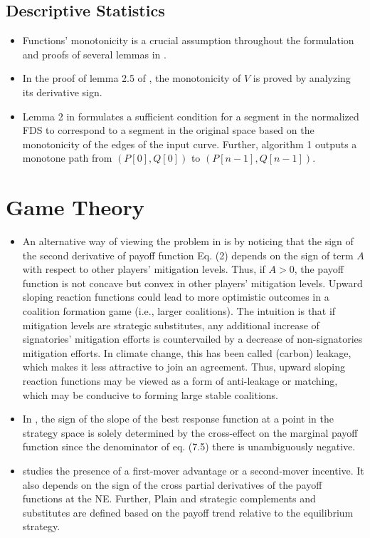 \documentclass[11pt]{book}
\begin{document}
\subsection{Descriptive Statistics}
\begin{itemize}
\item Functions' monotonicity is a crucial assumption throughout the formulation
and proofs of several lemmas in \cite{nock2015conformal}.
\item In the proof of lemma 2.5 of \cite{yang2017converses},
the monotonicity of $V$ is proved by analyzing its derivative sign.
\item Lemma 2 in \cite{aghamolaei2020approximating}
formulates a sufficient condition for a segment in the normalized
FDS to correspond to a segment in the original space based on the
monotonicity of the edges of the input curve. Further, algorithm 1
outputs a monotone path from $\left(P\left[0\right],Q\left[0\right]\right)$
to $\left(P\left[n-1\right],Q\left[n-1\right]\right)$.
\end{itemize}

\section{Game Theory}
\begin{itemize}
\item An alternative way of viewing the problem in \cite{bayramoglu2018climate}
is by noticing that the sign of the second derivative of payoff function
Eq. (2) depends on the sign of term $A$ with respect to other players\textquoteright{}
mitigation levels. Thus, if $A>0$, the payoff function is not concave
but convex in other players' mitigation levels. Upward sloping reaction
functions could lead to more optimistic outcomes in a coalition formation
game (i.e., larger coalitions). The intuition is that if mitigation
levels are strategic substitutes, any additional increase of signatories\textquoteright{}
mitigation efforts is countervailed by a decrease of non-signatories
mitigation efforts. In climate change, this has been called (carbon)
leakage, which makes it less attractive to join an agreement. Thus,
upward sloping reaction functions may be viewed as a form of anti-leakage
or matching, which may be conducive to forming large stable coalitions.
\item In \cite{corchon2018handbook},
the sign of the slope of the best response function at a point in
the strategy space is solely determined by the cross-effect on the
marginal payoff function since the denominator of eq. (7.5) there
is unambiguously negative.
\item \cite{hoffmann2020endogenous}
studies the presence of a first-mover advantage or a second-mover
incentive. It also depends on the sign of the cross partial derivatives
of the payoff functions at the NE. Further, Plain and strategic complements
and substitutes are defined based on the payoff trend relative to
the equilibrium strategy.
\end{itemize}
\end{document}
